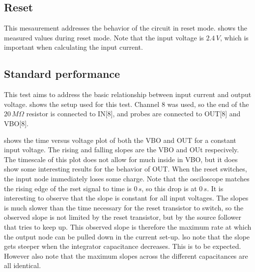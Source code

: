 \documentclass{article}
\begin{document}
\subsection{Reset}
This mesaurement addresses the behavior of the circuit in reset mode.  shows the measured values during reset mode. Note that the input voltage is $2.4\,V$, which is important when calculating the input current. 








\clearpage
\subsection{Standard performance}\label{ssec:standard}
This test aims to address the basic relationship between input current and output voltage.  shows the setup used for this test. Channel 8 was used, so the end of the $20\,M\Omega$ resistor is connected to IN[8], and probes are connected to OUT[8] and VBO[8]. 



 shows the time versus voltage plot of both the VBO and OUT for a constant input voltage. The rising and falling slopes are the VBO and OUt respecively. The timescale of this plot does not allow for much inside in VBO, but it does show some interesting results for the behavior of OUT. When the reset switches, the input node immediately loses some charge. Note that the osciloscope matches the rising edge of the rset signal to time is $0\,s$, so this drop is at $0\,s$. It is interesting to observe that the slope is constant for all input voltages. The slopes is much slower than the time necessary for the reset transistor to switch, so the observed slope is not limited by the reset transistor, but by the source follower that tries to keep up. This observed slope is therefore the maximum rate at which the output node can be pulled down in the current set-up.  lso note that the slope gets steeper when the integrator capacitance decreases. This is to be expected. However also note that the maximum slopes across the different capacitances are all identical.
\end{document}
